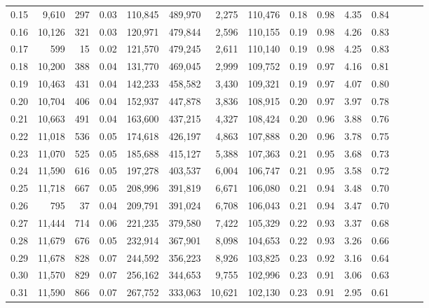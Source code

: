 \begin{tabular}{rrrrrrrrrrrrrrr}
0.15 &   9,610 &    297 &  0.03 &  110,845 &  489,970 &    2,275 &  110,476 &  0.18 &  0.98 &  4.35 &      0.84 \\
0.16 &  10,126 &    321 &  0.03 &  120,971 &  479,844 &    2,596 &  110,155 &  0.19 &  0.98 &  4.26 &      0.83 \\
0.17 &     599 &     15 &  0.02 &  121,570 &  479,245 &    2,611 &  110,140 &  0.19 &  0.98 &  4.25 &      0.83 \\
0.18 &  10,200 &    388 &  0.04 &  131,770 &  469,045 &    2,999 &  109,752 &  0.19 &  0.97 &  4.16 &      0.81 \\
0.19 &  10,463 &    431 &  0.04 &  142,233 &  458,582 &    3,430 &  109,321 &  0.19 &  0.97 &  4.07 &      0.80 \\
0.20 &  10,704 &    406 &  0.04 &  152,937 &  447,878 &    3,836 &  108,915 &  0.20 &  0.97 &  3.97 &      0.78 \\
0.21 &  10,663 &    491 &  0.04 &  163,600 &  437,215 &    4,327 &  108,424 &  0.20 &  0.96 &  3.88 &      0.76 \\
0.22 &  11,018 &    536 &  0.05 &  174,618 &  426,197 &    4,863 &  107,888 &  0.20 &  0.96 &  3.78 &      0.75 \\
0.23 &  11,070 &    525 &  0.05 &  185,688 &  415,127 &    5,388 &  107,363 &  0.21 &  0.95 &  3.68 &      0.73 \\
0.24 &  11,590 &    616 &  0.05 &  197,278 &  403,537 &    6,004 &  106,747 &  0.21 &  0.95 &  3.58 &      0.72 \\
0.25 &  11,718 &    667 &  0.05 &  208,996 &  391,819 &    6,671 &  106,080 &  0.21 &  0.94 &  3.48 &      0.70 \\
0.26 &     795 &     37 &  0.04 &  209,791 &  391,024 &    6,708 &  106,043 &  0.21 &  0.94 &  3.47 &      0.70 \\
0.27 &  11,444 &    714 &  0.06 &  221,235 &  379,580 &    7,422 &  105,329 &  0.22 &  0.93 &  3.37 &      0.68 \\
0.28 &  11,679 &    676 &  0.05 &  232,914 &  367,901 &    8,098 &  104,653 &  0.22 &  0.93 &  3.26 &      0.66 \\
0.29 &  11,678 &    828 &  0.07 &  244,592 &  356,223 &    8,926 &  103,825 &  0.23 &  0.92 &  3.16 &      0.64 \\
0.30 &  11,570 &    829 &  0.07 &  256,162 &  344,653 &    9,755 &  102,996 &  0.23 &  0.91 &  3.06 &      0.63 \\
0.31 &  11,590 &    866 &  0.07 &  267,752 &  333,063 &   10,621 &  102,130 &  0.23 &  0.91 &  2.95 &      0.61 \\

\end{tabular}
